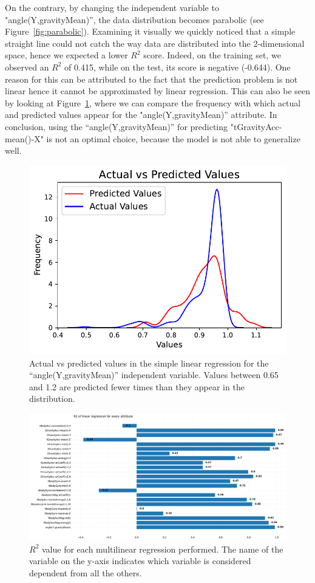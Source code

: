 \documentclass[10pt, a4paper, twocolumn]{article}
\begin{document}
On the contrary, by changing the independent variable to "angle(Y,gravityMean)”, the data distribution becomes parabolic (see Figure~\ref{fig:parabolic}). Examining it visually we quickly noticed that a simple straight line could not catch the way data are distributed into the 2-dimensional space, hence we expected a lower $R^2$ score. Indeed, on the training set, we observed an $R^2$ of 0.415, while on the test, its score is negative (-0.644).  One reason for this can be attributed to the fact that the prediction problem is not linear hence it cannot be approximated by linear regression.  This can also be seen  by looking at Figure~\ref{fig:actual}, where we can compare the frequency with which actual and predicted values appear for the "angle(Y,gravityMean)” attribute. 
In conclusion, using the “angle(Y,gravityMean)” for predicting "tGravityAcc-mean()-X" is not an optimal choice, because the model is not able to generalize well.

\begin{figure}
    \centering
    \includegraphics[width=0.6\columnwidth]{immagini Lia/actual vs predicted.pdf}
    \caption{Actual vs predicted values in the simple linear regression for the “angle(Y,gravityMean)” independent variable. Values between 0.65 and 1.2 are predicted fewer times than they appear in the distribution.}
    \label{fig:actual}
\end{figure}

\begin{figure}[h]
    \centering
    \includegraphics[width=\columnwidth]{r2_lin.pdf}
    \caption{$R^2$ value for each multilinear regression performed. The name of the variable on the y-axis indicates which variable is considered dependent from all the others.}
    \label{fig:r2_lin}
\end{figure}
\end{document}
